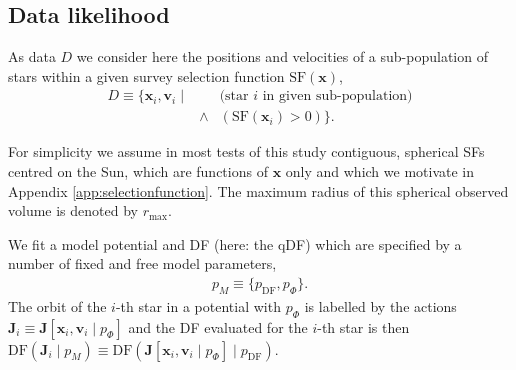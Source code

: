 \documentclass[iop,revtex4,numberedappendix,appendixfloats]{emulateapj}
\newcommand{\vect}[1]{\boldsymbol{#1}}
\newcommand{\pmodel}{\ensuremath{p_M}}
\begin{document}

\subsection{Data likelihood} \label{sec:data_likelihood}

As data $D$ we consider here the positions and velocities of a sub-population of stars within a given survey selection function $\text{SF}(\vect{x})$,
\begin{eqnarray*}
D \equiv \{ \vect{x}_i,\vect{v}_i \mid && \text{(star $i$ in given sub-population)}\nonumber\\
&\wedge& (\text{SF}(\vect{x}_i) > 0) \}.
\end{eqnarray*}

For simplicity we assume in most tests of this study contiguous, spherical SFs centred on the Sun, which are functions of $\vect{x}$ only and which we motivate in Appendix \ref{app:selectionfunction}. The maximum radius of this spherical observed volume is denoted by $r_\text{max}$.

We fit a model potential and DF (here: the qDF) which are specified by a number of fixed and free model parameters,
\begin{eqnarray*}
\pmodel \equiv \{ p_\text{DF} , p_\Phi \}.
\end{eqnarray*}
The orbit of the $i$-th star in a potential with $p_\Phi$ is labelled by the actions $\vect{J}_i \equiv \vect{J}[\vect{x}_i,\vect{v}_i\mid p_{\Phi}]$ and the DF evaluated for the $i$-th star is then $\text{DF}(\vect{J}_i \mid \pmodel) \equiv \text{DF}(\vect{J}[\vect{x}_i,\vect{v}_i\mid p_{\Phi}] \mid p_\text{DF})$.
\end{document}
